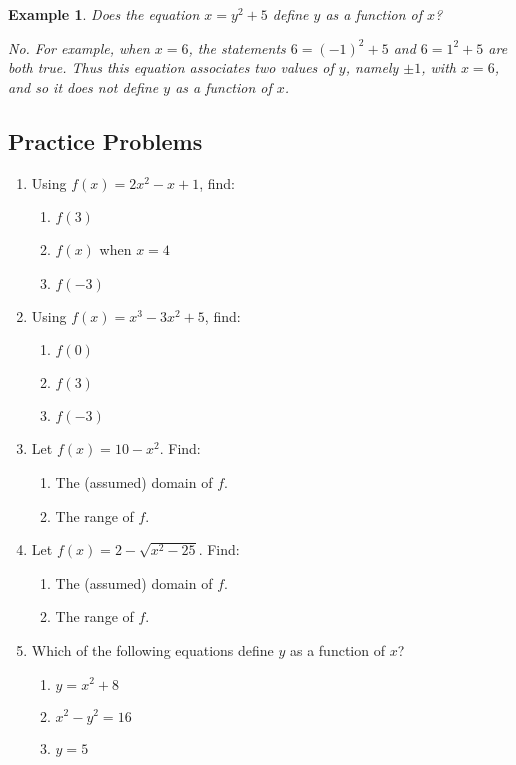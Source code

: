 \documentclass[11pt]{book}               %
\newtheorem{example}{Example}
\begin{document}
\begin{example}
Does the equation $x=y^2+5$ define $y$ as a function of $x$? 
\normalfont

No.  For example, when $x=6$, 
the statements $6 = (-1)^2 + 5$ and $6 = 1^2 + 5$ are both true.
Thus this equation associates two values of $y$, namely $\pm 1$, with 
$x = 6$, and so it does not define $y$ as a function of $x$.
\end{example}

\subsection{Practice Problems}
\begin{enumerate}
\item Using $ f(x) = 2x^2 - x +1$, find: 
\begin{enumerate}
\item $f(3)$ 
\item $f(x)$ when $ x = 4$ 
\item $f(-3)$ 
\end{enumerate}
\item Using $ f(x) = x^3 - 3x^2 +5$, find: 
\begin{enumerate}
\item $f(0)$ 
\item $f(3)$ 
\item $f(-3)$ 
\end{enumerate}

\item Let $f(x) = 10-x^2$.  Find:
\begin{enumerate}
\item The (assumed) domain of $f$.
\item The range of $f$.
\end{enumerate}

\item Let $f(x) =  2 - \sqrt{x^2 - 25}$.  Find:
\begin{enumerate}
\item The (assumed) domain of $f$.
\item The range of $f$.
\end{enumerate}


\item Which of the following equations define $y$ as a function of $x$? 
\begin{enumerate}
\item $y=x^2+8$
\item $x^2-y^2=16$
\item $y=5$
\end{enumerate}
\end{enumerate}
\end{document}

